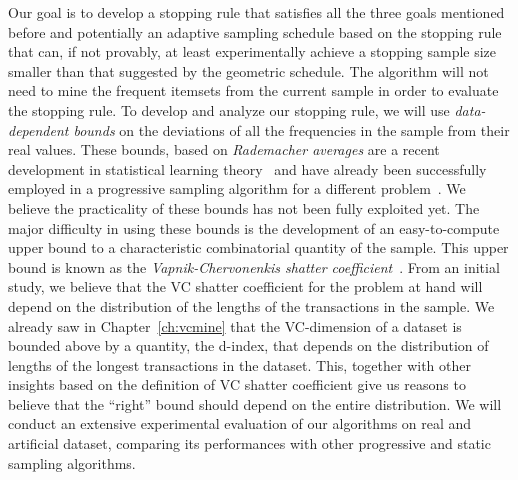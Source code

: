 Our goal is to develop a stopping rule that satisfies all the three goals
mentioned before and potentially an adaptive sampling schedule based on the
stopping rule that can, if not provably, at least experimentally achieve a
stopping sample size smaller than that suggested by the geometric schedule.
The algorithm will not need to mine the frequent itemsets from the current
sample in order to evaluate the stopping rule. To develop and analyze our
stopping rule, we will use \emph{data-dependent bounds} on the deviations of all
the frequencies in the sample from their real values. These bounds, based on
\emph{Rademacher averages} are a recent development in statistical learning
theory~\citep{BoucheronBL05,Kaariainen04,KaariainenME04,KoltchinskiiAADP00,Koltchniskii01}
and have already been successfully employed in a progressive sampling algorithm
for a different problem~\citep{ElomaaK02}. We believe the practicality of these
bounds has not been fully exploited yet. The major difficulty in using these
bounds is the development of an easy-to-compute upper bound to a characteristic
combinatorial quantity of the sample. This upper bound is known as the
\emph{Vapnik-Chervonenkis shatter
coefficient}~\citep{BoucheronBL05,DevroyeGL96}. From an initial study, we
believe that the VC shatter coefficient for the problem at hand will depend on
the distribution of the lengths of the transactions in the sample. We already
saw in Chapter~\ref{ch:vcmine} that the VC-dimension of a dataset is 
bounded above by a quantity, the d-index, that depends on the
distribution of lengths of the longest transactions in the dataset. This,
together with other insights based on the definition of VC shatter coefficient
give us reasons to believe that the ``right'' bound should depend on the entire
distribution. We will conduct an extensive experimental evaluation of our
algorithms on real and artificial dataset, comparing its performances with other
progressive and static sampling algorithms.

